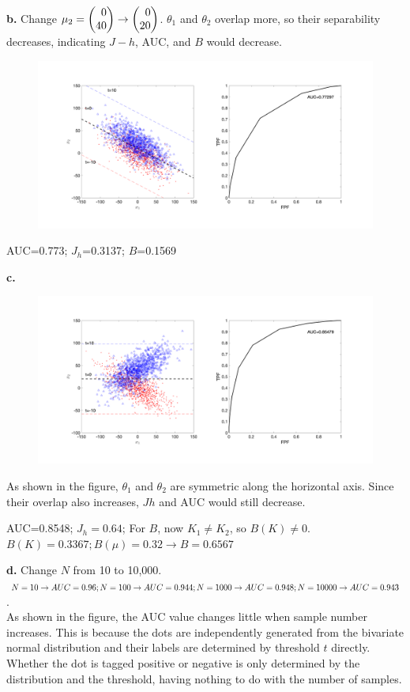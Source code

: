 \documentclass[12pt,a4paper]{article}
\begin{document}
    \textbf{b.} Change $\mu_2=\newvec{0\\40}\rightarrow\newvec{0\\20}$. $\theta_1$ and $\theta_2$ overlap more, so their separability decreases, indicating $J-h$, AUC, and $B$ would decrease.

    \begin{figure}[!ht]
        \includegraphics[width=\textwidth]{hw9_3b.png}
    \end{figure}
    AUC=0.773; $J_h$=0.3137; $B$=0.1569
    
    \textbf{c.} 
    \begin{figure}[!ht]
        \includegraphics[width=\textwidth]{hw9_3c.png}
    \end{figure}
    As shown in the figure, $\theta_1$ and $\theta_2$ are symmetric along the horizontal axis. Since their overlap also increases, $Jh$ and AUC would still decrease.

    AUC=0.8548; $J_h=0.64$; For $B$, now $K_1\neq K_2$, so $B(K)\neq 0$. $B(K)=0.3367;B(\mu)=0.32\rightarrow B=0.6567$
    
    \textbf{d.}    
    Change $N$ from 10 to 10,000.$N=10\rightarrow AUC=0.96;\\
    N=100\rightarrow AUC=0.944;\\
    N=1000\rightarrow AUC=0.948;\\
    N=10000\rightarrow AUC=0.943$.\\
    As shown in the figure, the AUC value changes little when sample number increases. This is because the dots are independently generated from the bivariate normal distribution and their labels are determined by threshold $t$ directly. Whether the dot is tagged positive or negative is only determined by the distribution and the threshold, having nothing to do with the number of samples. 
\end{document}
